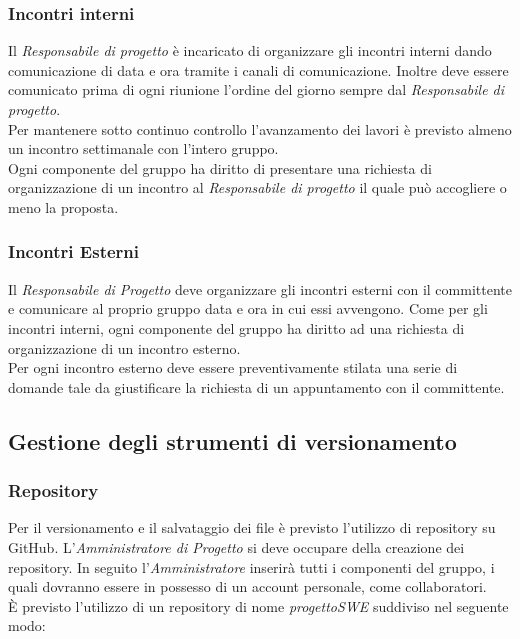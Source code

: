 \documentclass[../NormediProgetto.tex]{subfiles}
\begin{document}
	\subsubsection{Incontri interni}
	
	Il \textit{Responsabile di progetto} è incaricato di organizzare gli incontri interni dando comunicazione di data e ora tramite i canali di comunicazione. Inoltre deve essere comunicato prima di ogni riunione l'ordine del giorno sempre dal \textit{Responsabile di progetto}.
	\\ \noindent Per mantenere sotto continuo controllo l'avanzamento dei lavori è previsto almeno un incontro settimanale con l'intero gruppo.
	\\ \noindent Ogni componente del gruppo ha diritto di presentare una richiesta di organizzazione di un incontro al \textit{Responsabile di progetto} il quale può accogliere o meno la proposta.
	
	\subsubsection{Incontri Esterni}
	
	Il \textit{Responsabile di Progetto} deve organizzare gli incontri esterni con il committente e comunicare al proprio gruppo data e ora in cui essi avvengono. Come per gli incontri interni, ogni componente del gruppo ha diritto ad una richiesta di organizzazione di un incontro esterno.
	\\ \noindent Per ogni incontro esterno deve essere preventivamente stilata una serie di domande tale da giustificare la richiesta di un appuntamento con il committente.
	
	
	\subsection{Gestione degli strumenti di versionamento}
	
	\subsubsection{Repository}
	
	Per il versionamento e il salvataggio dei file è previsto l'utilizzo di repository su GitHub. L'\textit{Amministratore di Progetto} si deve occupare della creazione dei repository. In seguito l'\textit{Amministratore} inserirà tutti i componenti del gruppo, i quali dovranno essere in possesso di un account personale, come collaboratori.
	\\ \noindent È previsto l'utilizzo di un repository di nome \textit{progettoSWE} suddiviso nel seguente modo:
	
\end{document}
